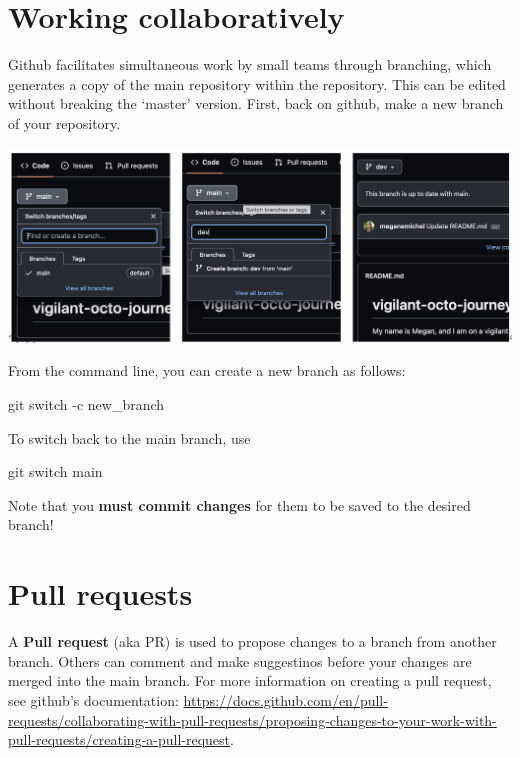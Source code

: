 \documentclass[
  letterpaper,
]{book}
\newenvironment{Shaded}{}{}
\newcommand{\AttributeTok}[1]{\textcolor[rgb]{0.84,0.23,0.29}{#1}}
\newcommand{\FunctionTok}[1]{\textcolor[rgb]{0.44,0.26,0.76}{#1}}
\newcommand{\NormalTok}[1]{\textcolor[rgb]{0.14,0.16,0.18}{#1}}
\begin{document}
\hypertarget{working-collaboratively}{%
\section{Working collaboratively}\label{working-collaboratively}}

Github facilitates simultaneous work by small teams through branching,
which generates a copy of the main repository within the repository.
This can be edited without breaking the `master' version. First, back on
github, make a new branch of your repository.

\includegraphics{assets/images/chapters/introduction-to-git/git_switch.png}

From the command line, you can create a new branch as follows:

\begin{Shaded}
\begin{Highlighting}[]
\FunctionTok{git}\NormalTok{ switch }\AttributeTok{{-}c}\NormalTok{ new\_branch}
\end{Highlighting}
\end{Shaded}

To switch back to the main branch, use

\begin{Shaded}
\begin{Highlighting}[]
\FunctionTok{git}\NormalTok{ switch main}
\end{Highlighting}
\end{Shaded}

Note that you \textbf{must commit changes} for them to be saved to the
desired branch!

\hypertarget{pull-requests}{%
\section{Pull requests}\label{pull-requests}}

A \textbf{Pull request} (aka PR) is used to propose changes to a branch
from another branch. Others can comment and make suggestinos before your
changes are merged into the main branch. For more information on
creating a pull request, see github's documentation:
\url{https://docs.github.com/en/pull-requests/collaborating-with-pull-requests/proposing-changes-to-your-work-with-pull-requests/creating-a-pull-request}.
\end{document}
